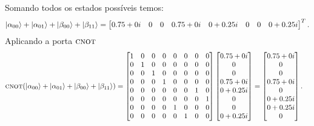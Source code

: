 Somando todos os estados possíveis temos:
\begin{equation}
  \ket{\alpha_{00}}+\ket{\alpha_{01}}+\ket{\beta_{00}}+\ket{\beta_{11}} =
  \begin{bmatrix} {0.75+0i} & 0 & 0 & {0.75+0i} & {0+0.25i} & 0 & 0 & {0+0.25i} \end{bmatrix}^T.
\end{equation}
Aplicando a porta \(\operatorname{\textsc{cnot}}\)
\begin{equation}
  \begin{split}
    \operatorname{\textsc{cnot}} (\ket{\alpha_{00}}+\ket{\alpha_{01}}+\ket{\beta_{00}}+\ket{\beta_{11}}) &=
    \begin{bmatrix}
    1 & 0 & 0 & 0 & 0 & 0 & 0 & 0 \\
    0 & 1 & 0 & 0 & 0 & 0 & 0 & 0 \\
    0 & 0 & 1 & 0 & 0 & 0 & 0 & 0 \\
    0 & 0 & 0 & 1 & 0 & 0 & 0 & 0 \\
    0 & 0 & 0 & 0 & 0 & 0 & 1 & 0 \\
    0 & 0 & 0 & 0 & 0 & 0 & 0 & 1 \\
    0 & 0 & 0 & 0 & 1 & 0 & 0 & 0 \\
    0 & 0 & 0 & 0 & 0 & 1 & 0 & 0
    \end{bmatrix}
    \begin{bmatrix} {0.75+0i} \\ 0 \\ 0 \\ {0.75+0i} \\ {0+0.25i} \\ 0 \\ 0 \\ {0+0.25i} \end{bmatrix} =
    \begin{bmatrix} {0.75+0i} \\ 0 \\ 0 \\ {0.75+0i} \\ 0 \\ {0+0.25i} \\ {0+0.25i} \\ 0 \end{bmatrix}.
  \end{split}
\end{equation}

